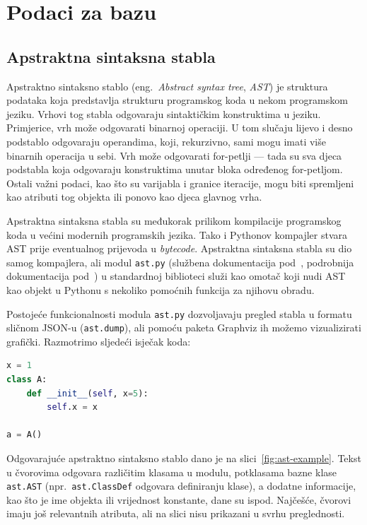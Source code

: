 \section{Podaci za bazu}

\subsection{Apstraktna sintaksna stabla}
Apstraktno sintaksno stablo (eng.\ \textsl{Abstract syntax tree}, \textsl{AST}) je struktura podataka koja predstavlja strukturu programskog koda u nekom programskom jeziku. Vrhovi tog stabla odgovaraju sintaktičkim konstruktima u jeziku. Primjerice, vrh može odgovarati binarnoj operaciji. U tom slučaju lijevo i desno podstablo odgovaraju operandima, koji, rekurzivno, sami mogu imati više binarnih operacija u sebi. Vrh može odgovarati for-petlji --- tada su sva djeca podstabla koja odgovaraju konstruktima unutar bloka određenog for-petljom. Ostali važni podaci, kao što su varijabla i granice iteracije, mogu biti spremljeni kao atributi tog objekta ili ponovo kao djeca glavnog vrha.

Apstraktna sintaksna stabla su međukorak prilikom kompilacije programskog koda u većini modernih programskih jezika. Tako i Pythonov kompajler stvara AST prije eventualnog prijevoda u \emph{bytecode}. Apstraktna sintaksna stabla su dio samog kompajlera, ali modul \texttt{ast.py} (službena dokumentacija pod~\cite{docs:ast}, podrobnija dokumentacija pod~\cite{docs:gts}) u standardnoj biblioteci služi kao omotač koji nudi AST kao objekt u Pythonu s nekoliko pomoćnih funkcija za njihovu obradu.

Postojeće funkcionalnosti modula \texttt{ast.py} dozvoljavaju pregled stabla u formatu sličnom JSON-u (\texttt{ast.dump}), ali pomoću paketa Graphviz ih možemo vizualizirati grafički. Razmotrimo sljedeći isječak koda:
\begin{lstlisting}[language=Python]
x = 1
class A:
    def __init__(self, x=5):
        self.x = x

a = A()
\end{lstlisting}
Odgovarajuće apstraktno sintaksno stablo dano je na slici~\ref{fig:ast-example}.
Tekst u čvorovima odgovara različitim klasama u modulu, potklasama bazne klase \texttt{ast.AST} (npr.\ \texttt{ast.ClassDef} odgovara definiranju klase), a dodatne informacije, kao što je ime objekta ili vrijednost konstante, dane su ispod.
Najčešće, čvorovi imaju još relevantnih atributa, ali na slici nisu prikazani u svrhu preglednosti.

